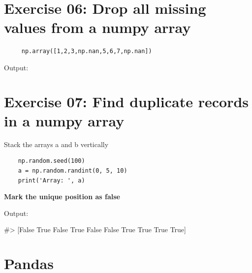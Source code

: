 \documentclass{42-en}
\begin{document}


\chapter{Exercise 06:  Drop all missing values from a numpy array}
\makeheaderfiles
\vspace{1em}

\begin{lstlisting}
     np.array([1,2,3,np.nan,5,6,7,np.nan])
\end{lstlisting}

\vspace{1em}
Output:\linebreak
\begin{42console}
[ 1.  2.  3.  5.  6.  7.]
\end{42console}
\nextexercice
\newpage



\chapter{Exercise 07:  Find duplicate records in a numpy array}
\makeheaderfiles
\vspace{1em}
Stack the arrays a and b vertically
\vspace{1em}

\begin{lstlisting}
    np.random.seed(100)
    a = np.random.randint(0, 5, 10)
    print('Array: ', a)
\end{lstlisting}

\vspace{1em}

\textbf{Mark the unique position as false}
 
\vspace{1em}
 
Output:\linebreak
\begin{42console}
#> [False  True False  True False False  True  True  True  True]
\end{42console}

\chapter{Pandas}
\end{document}
